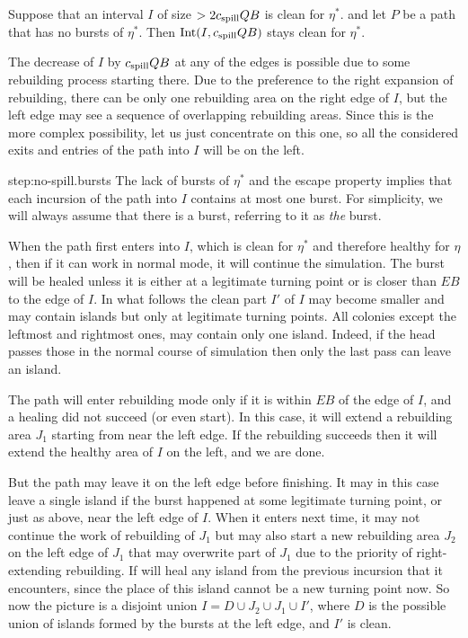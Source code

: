 \documentclass[11pt]{memoir}
\theoremstyle{definition} %
\def\B{B}
\newcommand{\E}{E}
\newcommand{\Int}{\mathrm{Int}}
\newcommand{\Q}{Q}
\newcommand{\cns}[1]{c_{\textrm{\upshape #1}}}
\newcommand{\CSpill}{\cns{spill}}
\begin{document}
\begin{lemma}\label{lem:spill-bound}
Suppose that an interval \( I \) of size \( > 2\CSpill\Q\B \) is clean for \( \eta^{*} \). and
let \( P \) be a path that has no bursts of \( \eta^{*} \).
Then \( \Int(I,\CSpill\Q\B) \) stays clean for \( \eta^{*} \).
\end{lemma}
\begin{Proof}
  The decrease of \( I \) by \( \CSpill\Q\B \) at any of the edges is possible due to some rebuilding
  process starting there.
  Due to the preference to the right expansion of rebuilding, there can be only one rebuilding area on
  the right edge of \( I \), but the left edge may see a sequence of overlapping rebuilding areas.
  Since this is the more complex possibility, let us just concentrate on this one, so all the
  considered exits and entries of the path into \( I \) will be on the left.

  \begin{step+}{step:no-spill.bursts}
  The lack of bursts of \( \eta^{*} \) and the escape property implies that
  each incursion of the path into \( I \) contains at most one burst.
  For simplicity, we will always assume that there is a burst, referring to it as \emph{the} burst.
\end{step+}

When the path first enters into \( I \), which is clean for \( \eta^{*} \) and therefore healthy
for \( \eta \), then if it can work in normal mode, it will continue the simulation.
The burst will be healed unless it is either at a legitimate turning point or is
closer than \( \E\B \) to the edge of \( I \).
In what follows the clean part \( I' \) of \( I \) may become smaller and may contain islands
but only at legitimate turning points.
All colonies except the leftmost and rightmost ones, may contain only one island.
Indeed, if the head passes those in the normal course of simulation then only the
last pass can leave an island.

The path will enter rebuilding mode only if it is within \( \E\B \) of the edge of \( I \),
and a healing did not succeed (or even start).
In this case, it will extend a rebuilding area \( J_{1} \) starting from near the left edge.
If the rebuilding succeeds then it will extend the healthy area of  \( I \) on the left,
and we are done.

But the path may leave it on the left edge before finishing.
It may in this case leave a single island if the burst happened at some legitimate turning point,
or just as above, near the left edge of \( I \).
When it enters next time, it may not continue the work
of rebuilding of \( J_{1} \) but may also start a new rebuilding area \( J_{2} \)
on the left edge of \( J_{1} \) that may overwrite part of \( J_{1} \)
due to the priority of right-extending rebuilding.
If will heal any island from the previous incursion that it encounters, since the place of
this island cannot be a new turning point now.
So now the picture is a disjoint union \( I=D\cup J_{2}\cup J_{1}\cup I' \),
where \( D \) is the possible union of islands formed by the bursts at the left
edge, and \( I' \) is clean.


\end{Proof}
\end{document}
